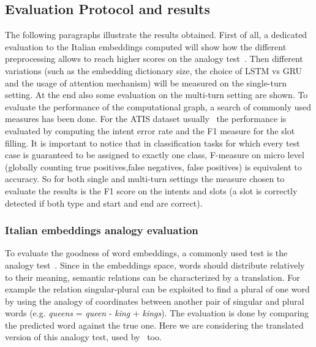 \subsection{Evaluation Protocol and results}
\label{validationMeasures}

The following paragraphs illustrate the results obtained. First of all, a dedicated evaluation to the Italian embeddings computed will show how the different preprocessing allows to reach higher scores on the analogy test~\cite{mikolov2013linguistic}. Then different variations (such as the embedding dictionary size, the choice of LSTM vs GRU and the usage of attention mechanism) will be measured on the single-turn setting. At the end also some evaluation on the multi-turn setting are shown. To evaluate the performance of the computational graph, a search of commonly used measures has been done. For the ATIS dataset usually~\cite{tur2010left} the performance is evaluated by computing the intent error rate and the F1 measure for the slot filling. It is important to notice that in classification tasks for which every test case is guaranteed to be assigned to exactly one class, F-measure on micro level (globally counting true positives,false negatives, false positives) is equivalent to accuracy. So for both single and multi-turn settings the measure chosen to evaluate the results is the F1 score on the intents and slots (a slot is correctly detected if both type and start and end are correct).

\subsubsection{Italian embeddings analogy evaluation}
To evaluate the goodness of word embeddings, a commonly used test is the analogy test~\cite{mikolov2013linguistic}. Since in the embeddings space, words should distribute relatively to their meaning, semantic relations can be characterized by a translation. For example the relation singular-plural can be exploited to find a plural of one word by using the analogy of coordinates between another pair of singular and plural words (e.g. \textit{queens} = \textit{queen} - \textit{king} + \textit{kings}). The evaluation is done by comparing the predicted word against the true one. Here we are considering the translated version of this analogy test, used by~\cite{berardi2015word} too.




